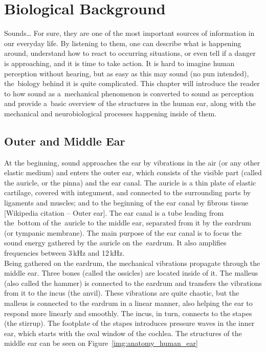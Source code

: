 \chapter{Biological Background}

Sounds\dots{} For sure, they are one of the most important sources of information in our everyday life. By listening to them, one can describe what is happening around, understand how to react to occurring situations, or even tell if a danger is approaching, and it is time to take action. It is hard to imagine human perception without hearing, but as easy as this may sound (no pun intended), the~biology behind it is quite complicated. This chapter will introduce the reader to how sound as a~mechanical phenomenon is converted to sound as perception and provide a~basic overview of the structures in the human ear, along with the mechanical and neurobiological processes happening inside of them.

\section{Outer and Middle Ear}

At the beginning, sound approaches the ear by vibrations in the air (or any other elastic medium) and enters the outer ear, which consists of the visible part (called the auricle, or the pinna) and the ear canal. The auricle is a thin plate of elastic cartilage, covered with integument, and connected to the surrounding parts by ligaments and muscles; and to the beginning of the ear canal by fibrous tissue [Wikipedia citation – Outer ear]. The ear canal is a tube leading from the~bottom of the~auricle to the middle ear, separated from it by the eardrum (or tympanic membrane). The main purpose of the ear canal is to focus the sound energy gathered by the auricle on the~eardrum. It also amplifies frequencies between 3\,kHz and 12\,kHz.\\

Being gathered on the eardrum, the mechanical vibrations propagate through the middle ear. Three bones (called the ossicles) are located inside of it. The malleus (also called the hammer) is connected to the eardrum and transfers the vibrations from it to the incus (the anvil). These vibrations are quite chaotic, but the malleus is connected to the eardrum in a linear manner, also helping the ear to respond more linearly and smoothly. The incus, in turn, connects to the stapes (the stirrup). The footplate of the stapes introduces pressure waves in the inner ear, which starts with the oval window of the cochlea. The structures of the middle ear can be seen on Figure~\ref{img:anatomy_human_ear}\\

